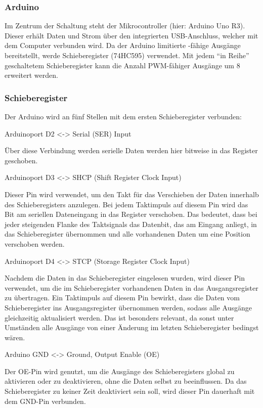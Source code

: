 \begin{enumerate}
\subsubsection{Arduino}

Im Zentrum der Schaltung steht der Mikrocontroller (hier: Arduino Uno R3).
Dieser erhält Daten und Strom über den integrierten USB-Anschluss, welcher mit dem Computer verbunden wird.
Da der Arduino limitierte -fähige Ausgänge bereitstellt, werde Schieberegister (74HC595) verwendet.
Mit jedem \enquote{in Reihe} geschaltetem Schieberegister kann die Anzahl \ac{PWM}-fähiger Ausgänge um 8 erweitert werden.

\subsubsection{Schieberegister}

Der Arduino wird an fünf Stellen mit dem ersten Schieberegister verbunden:

Arduinoport D2 <-> Serial (SER) Input

Über diese Verbindung werden serielle Daten werden hier bitweise in das Register geschoben.

Arduinoport D3 <-> SHCP (Shift Register Clock Input)

Dieser Pin wird verwendet, um den Takt für das Verschieben der Daten innerhalb des Schieberegisters anzulegen.
Bei jedem Taktimpuls auf diesem Pin wird das Bit am seriellen Dateneingang in das Register verschoben.
Das bedeutet, dass bei jeder steigenden Flanke des Taktsignals das Datenbit, das am Eingang anliegt, in das Schieberegister übernommen und alle vorhandenen Daten um eine Position verschoben werden.

Arduinoport D4 <-> STCP (Storage Register Clock Input)

Nachdem die Daten in das Schieberegister eingelesen wurden, wird dieser Pin verwendet, um die im Schieberegister vorhandenen Daten in das Ausgangsregister zu übertragen.
Ein Taktimpuls auf diesem Pin bewirkt, dass die Daten vom Schieberegister ins Ausgangsregister übernommen werden, sodass alle Ausgänge gleichzeitig aktualisiert werden.
Das ist besonders relevant, da sonst unter Umständen alle Ausgänge von einer Änderung im letzten Schieberegister bedingst wären.

Arduino GND <-> Ground, Output Enable (OE)

Der OE-Pin wird genutzt, um die Ausgänge des Schieberegisters global zu aktivieren oder zu deaktivieren, ohne die Daten selbst zu beeinflussen.
Da das Schieberegister zu keiner Zeit deaktiviert sein soll, wird dieser Pin dauerhaft mit dem GND-Pin verbunden.


\end{enumerate}
